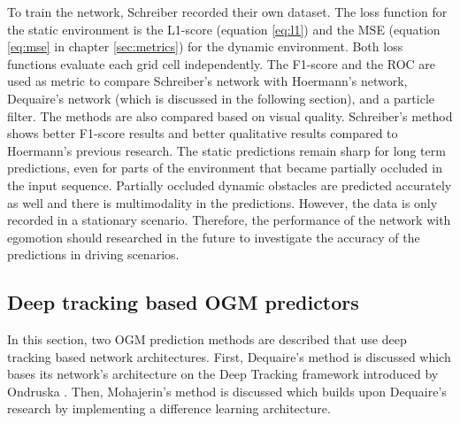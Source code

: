 To train the network, Schreiber \cite{schreiber2019long} recorded their own dataset. The loss function for the static environment is the L1-score (equation \ref{eq:l1}) and the \gls{MSE} (equation \ref{eq:mse} in chapter \ref{sec:metrics}) for the dynamic environment. Both loss functions evaluate each grid cell independently. The F1-score and the \gls{ROC} are used as metric to compare Schreiber's \cite{schreiber2019long} network with Hoermann's \cite{hoermann2018dynamic} network, Dequaire's \cite{dequaire2018deep} network (which is discussed in the following section), and a particle filter. The methods are also compared based on visual quality. Schreiber's \cite{schreiber2019long} method shows better F1-score results and better qualitative results compared to Hoermann's \cite{hoermann2018dynamic} previous research. The static predictions remain sharp for long term predictions, even for parts of the environment that became partially occluded in the input sequence. Partially occluded dynamic obstacles are predicted accurately as well and there is multimodality in the predictions. However, the data is only recorded in a stationary scenario. Therefore, the performance of the network with egomotion should researched in the future to investigate the accuracy of the predictions in driving scenarios.   

\subsection{Deep tracking based \gls{OGM} predictors} \label{subsec:deeptrack}
In this section, two \gls{OGM} prediction methods are described that use deep tracking based network architectures. First, Dequaire's \cite{dequaire2018deep} method is discussed which bases its network's architecture on the Deep Tracking framework introduced by Ondruska \cite{ondruska2016deep}. Then, Mohajerin's \cite{mohajerin2019multi} method is discussed which builds upon Dequaire's \cite{dequaire2018deep} research by implementing a difference learning architecture. \\

